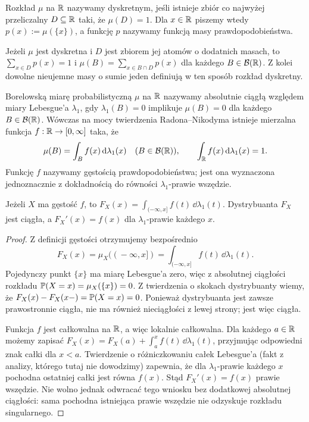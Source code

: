 \begin{definicja}
Rozkład $\mu$ na $\mathbb{R}$ nazywamy dyskretnym, jeśli istnieje zbiór
co najwyżej przeliczalny $D\subseteq\mathbb{R}$ taki, że $\mu(D)=1$.
Dla $x\in\mathbb{R}$ piszemy wtedy $p(x):=\mu(\{x\})$, a funkcję $p$
nazywamy funkcją masy prawdopodobieństwa.
\end{definicja}

Jeżeli $\mu$ jest dyskretna i $D$ jest zbiorem jej atomów o dodatnich
masach, to $\sum_{x\in D}p(x)=1$ i
$\mu(B)=\sum_{x\in B\cap D}p(x)$ dla każdego $B\in\mathcal B(\mathbb{R})$.
Z kolei dowolne nieujemne masy o sumie jeden definiują w ten sposób
rozkład dyskretny.

\begin{definicja}
Borelowską miarę probabilistyczną $\mu$ na $\mathbb{R}$ nazywamy
absolutnie ciągłą względem miary Lebesgue'a $\lambda_1$,
gdy $\lambda_1(B)=0$ implikuje $\mu(B)=0$ dla każdego
$B\in\mathcal B(\mathbb{R})$. Wówczas na mocy twierdzenia Radona--Nikodyma
istnieje mierzalna funkcja $f:\mathbb{R}\to[0,\infty]$ taka, że
\begin{equation}\label{eq:density}
\mu(B)=\int_B f(x)\,\mathrm{d}\lambda_1(x)
\quad(B\in\mathcal B(\mathbb{R})),\qquad
\int_{\mathbb{R}} f(x)\,\mathrm{d}\lambda_1(x)=1.
\end{equation}
Funkcję $f$ nazywamy gęstością prawdopodobieństwa; jest ona
wyznaczona jednoznacznie z dokładnością do równości
$\lambda_1$-prawie wszędzie.
\end{definicja}

\begin{stwierdzenie}
Jeżeli $X$ ma gęstość $f$, to
$F_X(x)=\int_{(-\infty,x]} f(t)\,\dd\lambda_1(t)$.
Dystrybuanta $F_X$ jest ciągła, a $F_X'(x)=f(x)$
dla $\lambda_1$-prawie każdego $x$.
\end{stwierdzenie}
\begin{proof}
Z definicji gęstości otrzymujemy bezpośrednio
\[
F_X(x)=\mu_X((\!-\infty,x])
=\int_{(-\infty,x]}f(t)\,\dd\lambda_1(t).
\]
Pojedynczy punkt $\{x\}$ ma miarę Lebesgue'a zero,
więc z absolutnej ciągłości rozkładu
$\mathbb{P}(X=x)=\mu_X(\{x\})=0$.
Z twierdzenia o skokach dystrybuanty wiemy,
że $F_X(x)-F_X(x-)=\mathbb{P}(X=x)=0$.
Ponieważ dystrybuanta jest zawsze prawostronnie ciągła,
nie ma również nieciągłości z lewej strony; jest więc ciągła.

Funkcja $f$ jest całkowalna na $\mathbb{R}$, a więc lokalnie
całkowalna. Dla każdego $a\in\mathbb{R}$ możemy zapisać
$F_X(x)=F_X(a)+\int_a^x f(t)\,\dd\lambda_1(t)$,
przyjmując odpowiedni znak całki dla $x<a$.
Twierdzenie o różniczkowaniu całek Lebesgue'a
(fakt z analizy, którego tutaj nie dowodzimy) zapewnia,
że dla $\lambda_1$-prawie każdego $x$ pochodna ostatniej
całki jest równa $f(x)$. Stąd $F_X'(x)=f(x)$ prawie wszędzie.
Nie wolno jednak odwracać tego wniosku bez dodatkowej
absolutnej ciągłości: sama pochodna istniejąca prawie
wszędzie nie odzyskuje rozkładu singularnego.
\end{proof}

